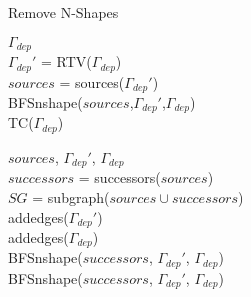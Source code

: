 \begin{algorithm}
\caption{Remove N-Shapes}
\label{alg:nshape}
\begin{algorithmic}[1]
 {$\Gamma_{dep}$}
\\$\Gamma_{dep}'$ = RTV($\Gamma_{dep}$)
\\$sources$ = sources($\Gamma_{dep}'$)
\\BFSnshape($sources$,$\Gamma_{dep}'$,$\Gamma_{dep}$)
\\TC($\Gamma_{dep}$)
\EndProcedure

 {$sources$, $\Gamma_{dep}'$, $\Gamma_{dep}$}
\\$successors$ = successors($sources$)
\\$SG$ = subgraph($sources \cup successors$)
\\addedges($\Gamma_{dep}'$)
\\addedges($\Gamma_{dep}$)
\\BFSnshape($successors$, $\Gamma_{dep}'$, $\Gamma_{dep}$)
\EndIf
{}
\\BFSnshape($successors$, $\Gamma_{dep}'$, $\Gamma_{dep}$)
\EndIf
\EndIf
\EndProcedure
\end{algorithmic}
\end{algorithm}


